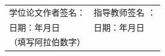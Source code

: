 \vspace{2em}

\noindent
\begin{tabular}{l l}
学位论文作者签名：   \underline{\hspace{7em}   }      &       \hspace{2em}指导教师签名 ： \underline{\hspace{9em} }     \\  
日期：\underline{\hspace{4.5em}}年\underline{\hspace{2.5em}}月\underline{\hspace{2.5em}}日  &     \hspace{2em}日期：\underline{\hspace{4.5em}}年\underline{\hspace{2.5em}}月\underline{\hspace{2.5em}}日 \\
（填写阿拉伯数字）

\end{tabular}



